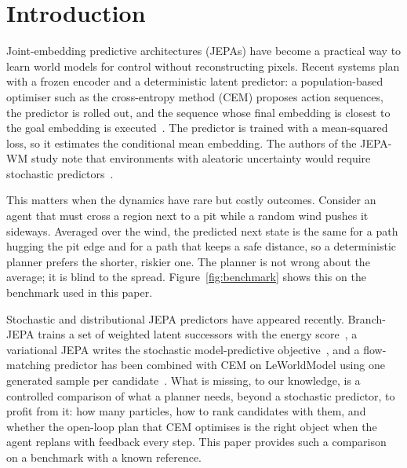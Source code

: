 \documentclass[preprint,12pt]{elsarticle}
\begin{document}
\section{Introduction}\label{sec:intro}

Joint-embedding predictive architectures (JEPAs) have become a practical way to learn world models for control without reconstructing pixels.
Recent systems plan with a frozen encoder and a deterministic latent predictor: a population-based optimiser such as the cross-entropy method (CEM) proposes action sequences, the predictor is rolled out, and the sequence whose final embedding is closest to the goal embedding is executed~\cite{zhou2024dinowm,maes2026lewm}.
The predictor is trained with a mean-squared loss, so it estimates the conditional mean embedding.
The authors of the JEPA-WM study note that environments with aleatoric uncertainty would require stochastic predictors~\cite{terver2025jepawm}.

This matters when the dynamics have rare but costly outcomes.
Consider an agent that must cross a region next to a pit while a random wind pushes it sideways.
Averaged over the wind, the predicted next state is the same for a path hugging the pit edge and for a path that keeps a safe distance, so a deterministic planner prefers the shorter, riskier one.
The planner is not wrong about the average; it is blind to the spread.
Figure~\ref{fig:benchmark} shows this on the benchmark used in this paper.

Stochastic and distributional JEPA predictors have appeared recently.
Branch-JEPA trains a set of weighted latent successors with the energy score~\cite{branchjepa2026}, a variational JEPA writes the stochastic model-predictive objective~\cite{vjepa2026}, and a flow-matching predictor has been combined with CEM on LeWorldModel using one generated sample per candidate~\cite{flowjepa2026}.
What is missing, to our knowledge, is a controlled comparison of what a planner needs, beyond a stochastic predictor, to profit from it: how many particles, how to rank candidates with them, and whether the open-loop plan that CEM optimises is the right object when the agent replans with feedback every step.
This paper provides such a comparison on a benchmark with a known reference.
\end{document}

